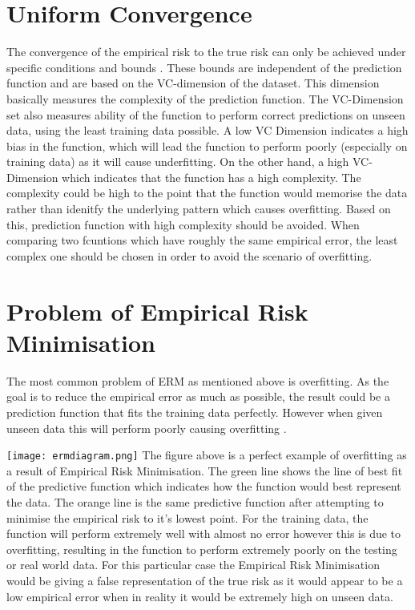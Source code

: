 \documentclass{article}
\begin{document}
\section{Uniform Convergence}
The convergence of the empirical risk to the true risk can only be achieved under specific conditions and bounds \citep{Clemencon2017}. These bounds are independent of the prediction function and are based on the VC-dimension of the dataset. This dimension basically measures the complexity of the prediction function. The VC-Dimension set also measures ability of the function to perform correct predictions on unseen data, using the least training data possible. A low VC Dimension indicates a high bias in the function, which will lead the function to perform poorly (especially on training data) as it will cause underfitting. On the other hand, a high VC-Dimension which indicates that the function has a high complexity. The complexity could be high to the point that the function would memorise the data rather than idenitfy the underlying pattern which causes overfitting. Based on this, prediction function with high complexity should be avoided. When comparing two fcuntions which have roughly the same empirical error, the least complex one should be chosen in order to avoid the scenario of overfitting.

\section{Problem of Empirical Risk Minimisation}
The most common problem of ERM as mentioned above is overfitting. As the goal is to reduce the empirical error as much as possible, the result could be a prediction function that fits the training data perfectly. However when given unseen data this will perform poorly causing overfitting \citep{UMachineLearning}. 

\texttt{[image: ermdiagram.png]}
The figure above is a perfect example of overfitting as a result of Empirical Risk Minimisation. The green line shows the line of best fit of the predictive function which indicates how the function would best represent the data. The orange line is the same predictive function after attempting to minimise the empirical risk to it's lowest point. For the training data, the function will perform extremely well with almost no error however this is due to overfitting, resulting in the function to perform extremely poorly on the testing or real world data. For this particular case the Empirical Risk Minimisation would be giving a false representation of the true risk as it would appear to be a low empirical error when in reality it would be extremely high on unseen data. 
\end{document}
